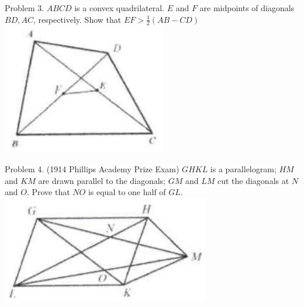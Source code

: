 \documentclass[10pt]{article}
\begin{document}
Problem 3. \(A B C D\) is a convex quadrilateral. \(E\) and \(F\) are midpoints of diagonals \(B D, A C\), respectively. Show that \(E F>\frac{1}{2}(A B-C D)\)\\
\includegraphics[max width=\textwidth, center]{2025_04_17_97bc1f7e44d93c271a88g-044(1)}

Problem 4. (1914 Phillips Academy Prize Exam) \(G H K L\) is a parallelogram; \(H M\) and \(K M\) are drawn parallel to the diagonals; \(G M\) and \(L M\) cut the diagonals at \(N\) and \(O\). Prove that \(N O\) is equal to one half of \(G L\).\\
\includegraphics[max width=\textwidth, center]{2025_04_17_97bc1f7e44d93c271a88g-044(2)}
\end{document}

